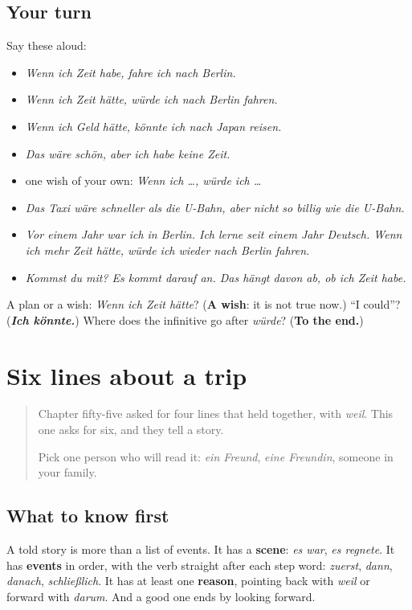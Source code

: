 \subsection*{Your turn}
Say these aloud:

\begin{itemize}
\raggedright
  \item \emph{Wenn ich Zeit habe, fahre ich nach Berlin.}
  \item \emph{Wenn ich Zeit hätte, würde ich nach Berlin fahren.}
  \item \emph{Wenn ich Geld hätte, könnte ich nach Japan reisen.}
  \item \emph{Das wäre schön, aber ich habe keine Zeit.}
  \item one wish of your own: \emph{Wenn ich …, würde ich …}
  \item \emph{Das Taxi wäre schneller als die U-Bahn, aber nicht so billig wie die U-Bahn.}
  \item \emph{Vor einem Jahr war ich in Berlin. Ich lerne seit einem Jahr Deutsch. Wenn ich mehr Zeit hätte, würde ich wieder nach Berlin fahren.}
  \item \emph{Kommst du mit? Es kommt darauf an. Das hängt davon ab, ob ich Zeit habe.}
\end{itemize}

\begin{tcolorbox}[breakable,colback=teal!4,colframe=teal!35!black,title={Before you move on}]
A plan or a wish: \emph{Wenn ich Zeit hätte}? (\textbf{A wish}: it is not true now.) \textquotedblleft{}I could\textquotedblright{}? (\emph{\textbf{Ich könnte.}}) Where does the infinitive go after \emph{würde}? (\textbf{To the end.})
\end{tcolorbox}
\section[(sechs Zeilen)]{Six lines about a trip}

\label{lesson:GE-W261-sechs-zeilen}



\begin{quote}
Chapter fifty-five asked for four lines that held together, with \emph{weil}. This one asks for six, and they tell a story.

Pick one person who will read it: \emph{ein Freund}, \emph{eine Freundin}, someone in your family.
\end{quote}

\subsection*{What to know first}
A told story is more than a list of events. It has a \textbf{scene}: \emph{es war}, \emph{es regnete}. It has \textbf{events} in order, with the verb straight after each step word: \emph{zuerst}, \emph{dann}, \emph{danach}, \emph{schließlich}. It has at least one \textbf{reason}, pointing back with \emph{weil} or forward with \emph{darum}. And a good one ends by looking forward.

